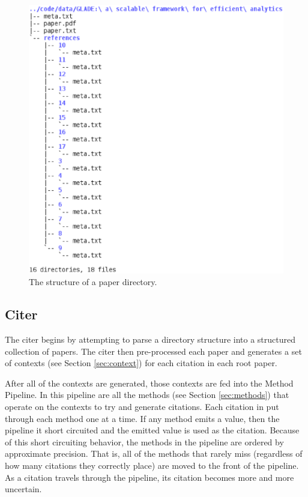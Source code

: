 \documentclass[10pt, conference, compsocconf]{IEEEtran}
\begin{document}
\begin{figure}[ht]
   \includegraphics[width=\columnwidth]{images/tree.eps}
        \caption{The structure of a paper directory.}
        \label{fig:tree}
\end{figure}

\subsection{Citer}\label{sec:archCiter}
The citer begins by attempting to parse a directory structure into a structured collection of papers.
The citer then pre-processed each paper and generates a set of contexts (see Section \ref{sec:context}) for each citation in each
root paper.

After all of the contexts are generated, those contexts are fed into the Method Pipeline. In this pipeline are all the methods (see Section \ref{sec:methods})
that operate on the contexts to try and generate citations. Each citation in put through each method one at a time. If any method emits a value, then the pipeline
it short circuited and the emitted value is used as the citation. Because of this short circuiting behavior, the methods in the pipeline are ordered by approximate
precision. That is, all of the methods that rarely miss (regardless of how many citations they correctly place) are moved to the front of the pipeline.
As a citation travels through the pipeline, its citation becomes more and more uncertain.
\end{document}
